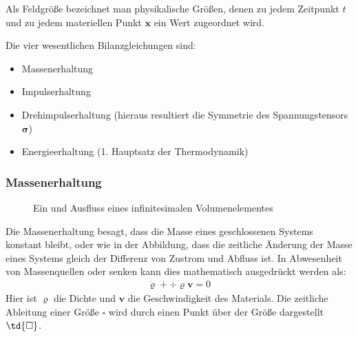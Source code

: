 \documentclass[letterpaper,10pt,german]{jupyterBook}
\let\sphinxpxdimen\pdfpxdimen\else\newdimen\sphinxpxdimen
\begin{document}
\sphinxAtStartPar
Als Feldgröße bezeichnet man physikalische Größen, denen zu jedem Zeitpunkt \(t\) und zu jedem materiellen Punkt \(\bm{x}\) ein Wert zugeordnet wird.

\sphinxAtStartPar
Die vier wesentlichen Bilanzgleichungen sind:
\begin{itemize}
\item {} 
\sphinxAtStartPar
Massenerhaltung

\item {} 
\sphinxAtStartPar
Impulserhaltung

\item {} 
\sphinxAtStartPar
Drehimpulserhaltung (hieraus resultiert die Symmetrie des Spannungstensors \(\bm{\sigma}\))

\item {} 
\sphinxAtStartPar
Energieerhaltung (1. Hauptsatz der Thermodynamik)

\end{itemize}


\subsubsection{Massenerhaltung}
\label{\detokenize{chapters/chapter1/elasticity:massenerhaltung}}
\begin{figure}[htbp]
\centering
\capstart

\noindent\sphinxincludegraphics[height=200\sphinxpxdimen]{{Massenbilanz}.jpg}
\caption{Ein\sphinxhyphen{} und Ausfluss eines infinitesimalen Volumenelementes }\label{\detokenize{chapters/chapter1/elasticity:massenbilanz}}\end{figure}

\sphinxAtStartPar
Die Massenerhaltung besagt, dass die Masse eines geschlossenen Systems konstant bleibt, oder wie in der Abbildung, dass die zeitliche Änderung der Masse eines Systems gleich der Differenz von Zustrom und Abfluss ist. In Abwesenheit von Massenquellen oder \sphinxhyphen{}senken kann dies mathematisch ausgedrückt werden als:
\begin{equation}\label{equation:chapters/chapter1/elasticity:Massenbilanz}
\begin{split}\dot{\varrho} +  \div{\varrho {\bm{v}}} = 0\end{split}
\end{equation}
\sphinxAtStartPar
Hier ist \(\varrho\) die Dichte und \(\bm{v}\) die Geschwindigkeit des Materials. Die zeitliche Ableitung einer Größe \(\square\) wird durch einen Punkt über der Größe dargestellt \(\td{\square}\).
\end{document}
